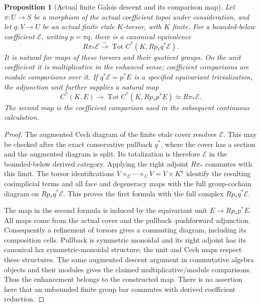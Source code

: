 \documentclass[11pt]{article}
\newtheorem{proposition}[theorem]{Proposition}
\theoremstyle{definition}
\theoremstyle{remark}
\begin{document}
\begin{proposition}[Actual finite Galois descent and its comparison map]
\label{prop:frag-actual-finite-galois-descent}
Let $\pi:U\to S$ be a morphism of the actual coefficient topoi under
consideration, and let $q:V\to U$ be an actual finite etale $K$-torsor,
with $K$ finite.  For a bounded-below coefficient $\mathcal E$, writing
$p=\pi q$, there is a canonical equivalence
\[
R\pi_*\mathcal E\xrightarrow{\sim}
 \operatorname{Tot}C^*(K,Rp_*q^*\mathcal E).
\]
It is natural for maps of these torsors and their quotient groups.
On the unit coefficient it is multiplicative in the enhanced sense;
coefficient comparisons are module comparisons over it.  If
$q^*\mathcal E=p^*E$ is a specified equivariant trivialization, the
adjunction unit further supplies a natural map
\[
 C^*(K,E)\longrightarrow
 \operatorname{Tot}C^*(K,Rp_*p^*E)
 \simeq R\pi_*\mathcal E.
\]
The second map is the coefficient comparison used in the subsequent
continuous calculation.
\end{proposition}

\begin{proof}
The augmented Cech diagram of the finite etale cover resolves
$\mathcal E$.  This may be checked after the exact conservative
pullback $q^*$, where the cover has a section and the augmented
diagram is split.  Its totalization is therefore $\mathcal E$ in
the bounded-below derived category.  Applying the right adjoint
$R\pi_*$ commutes with this limit.  The torsor identifications
$V\times_U\cdots\times_UV=V\times K^a$ identify the resulting
cosimplicial terms and all face and degeneracy maps with the full
group-cochain diagram on $Rp_*q^*\mathcal E$.  This proves the first
formula with the full complex $Rp_*q^*\mathcal E$.

The map in the second formula is induced by the equivariant unit
$E\to Rp_*p^*E$.  All maps come from the actual cover and the
pullback--pushforward adjunction.  Consequently a refinement of
torsors gives a commuting diagram, including its composition cells.
Pullback is symmetric monoidal and its right adjoint has its
canonical lax symmetric-monoidal structure; the unit and Cech maps
respect these structures.  The same augmented descent argument in
commutative algebra objects and their modules gives the claimed
multiplicative/module comparisons.  Thus the enhancement belongs to
the constructed map.
There is no assertion here that an unbounded finite group bar
commutes with derived coefficient reduction.
\end{proof}
\end{document}
